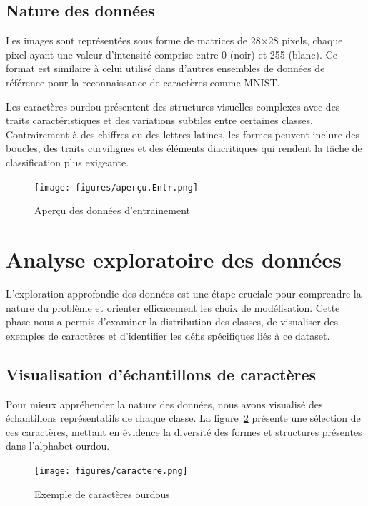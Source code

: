 \subsection{ Nature des données}

Les images sont représentées sous forme de matrices de 28×28 pixels, chaque pixel ayant une valeur d'intensité comprise entre 0 (noir) et 255 (blanc). Ce format est similaire à celui utilisé dans d'autres ensembles de données de référence pour la reconnaissance de caractères comme MNIST.

Les caractères ourdou présentent des structures visuelles complexes avec des traits caractéristiques et des variations subtiles entre certaines classes. Contrairement à des chiffres ou des lettres latines, les formes peuvent inclure des boucles, des traits curvilignes et des éléments diacritiques qui rendent la tâche de classification plus exigeante.

\begin{figure}[h]
\centering
\texttt{[image: figures/aperçu.Entr.png]}
\caption{Aperçu des données d'entrainement}
\label{fig:Entrainement_datasets}
\end{figure}


\section{Analyse exploratoire des données}

L'exploration approfondie des données est une étape cruciale pour comprendre la nature du problème et orienter efficacement les choix de modélisation. Cette phase nous a permis d'examiner la distribution des classes, de visualiser des exemples de caractères et d'identifier les défis spécifiques liés à ce dataset.

\subsection{Visualisation d'échantillons de caractères}
Pour mieux appréhender la nature des données, nous avons visualisé des échantillons représentatifs de chaque classe. La figure~\ref{fig:urdu_chars} présente une sélection de ces caractères, mettant en évidence la diversité des formes et structures présentes dans l'alphabet ourdou.

\begin{figure}[h]
\centering
\texttt{[image: figures/caractere.png]}
\caption{Exemple de caractères ourdous}
\label{fig:urdu_chars}
\end{figure}

